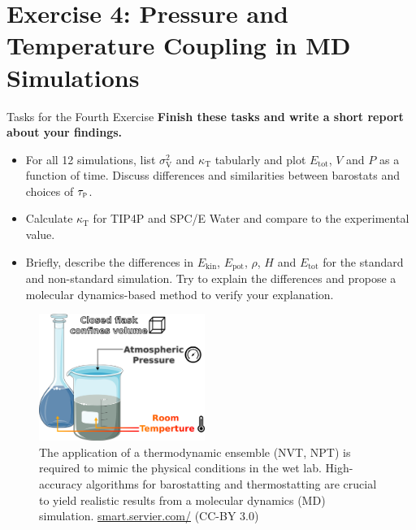 \documentclass[9pt,tutorial]{livecoms}
\begin{document}
\newpage

\section{Exercise 4: Pressure and Temperature Coupling in MD Simulations}\label{sec:TPcoupling}
\begin{Checklists}
    \begin{checklist}{Tasks for the Fourth Exercise}
    \textbf{Finish these tasks and write a short report about your findings.}
    \begin{itemize}
		\item For all 12 simulations, list $\sigma_\text{V}^2$ and $\kappa_\text{T}$ tabularly and plot $E_\text{tot}$, $V$ and $P$ as a function of time. Discuss differences and similarities between barostats and choices of $\tau_\text{\tiny P}$.
		\item Calculate $\kappa_\text{T}$ for TIP4P and SPC/E Water and compare to the experimental value.
		\item Briefly, describe the differences in $E_\text{kin}$, $E_\text{pot}$, $\rho$, $H$ and $E_\text{tot}$ for the standard and non-standard simulation. Try to explain the differences and propose a molecular dynamics-based method to verify your explanation.
	\end{itemize} 
    \end{checklist}
\end{Checklists}
\begin{figure}[H]
    \centering
    \includegraphics[width=0.48\textwidth]{figures/labsystems.png}
    \caption[Wet Labsystem Ensembles]{The application of a thermodynamic ensemble (NVT, NPT) is required to mimic the physical conditions in the wet lab. High-accuracy algorithms for barostatting and thermostatting are crucial to yield realistic results from a molecular dynamics (MD) simulation. \url{smart.servier.com/} (CC-BY 3.0)}
    \label{fig:wetlabsystems}
\end{figure}
\end{document}
